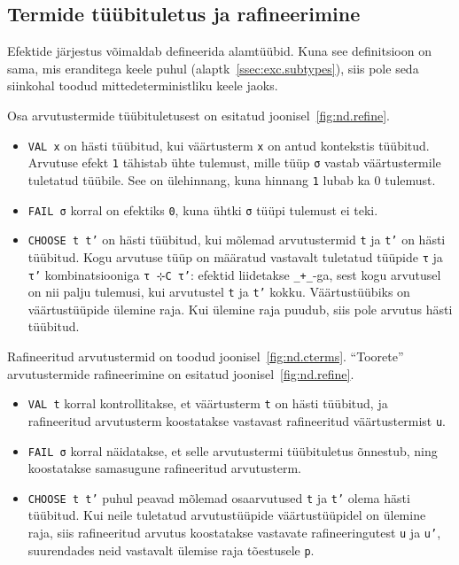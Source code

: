\documentclass[a4paper,12pt]{article}
\begin{document}
\subsection{Termide tüübituletus ja rafineerimine}

Efektide järjestus võimaldab defineerida alamtüübid.
Kuna see definitsioon on sama, mis eranditega keele puhul (alaptk~\ref{ssec:exc.subtypes}), siis pole seda siinkohal toodud mittedeterministliku keele jaoks.

Osa arvutustermide tüübituletusest on esitatud joonisel~\ref{fig:nd.refine}.
\begin{itemize}
\item {\tt VAL x} on hästi tüübitud, kui väärtusterm {\tt x} on antud kontekstis tüübitud. Arvutuse efekt {\tt 1} tähistab ühte tulemust, mille tüüp {\tt σ} vastab väärtustermile tuletatud tüübile. See on ülehinnang, kuna hinnang {\tt 1} lubab ka 0 tulemust.
\item {\tt FAIL σ} korral on efektiks {\tt 0}, kuna ühtki {\tt σ} tüüpi tulemust ei teki.
\item {\tt CHOOSE t t'} on hästi tüübitud, kui mõlemad arvutustermid {\tt t} ja {\tt t'} on hästi tüübitud. Kogu arvutuse tüüp on määratud vastavalt tuletatud tüüpide {\tt τ} ja {\tt τ'} kombinatsiooniga {\tt τ ⊹C τ'}: efektid liidetakse {\tt _+_}-ga, sest kogu arvutusel on nii palju tulemusi, kui arvutustel {\tt t} ja {\tt t'} kokku. Väärtustüübiks on väärtustüüpide ülemine raja. Kui ülemine raja puudub, siis pole arvutus hästi tüübitud.
\end{itemize}

Rafineeritud arvutustermid on toodud joonisel~\ref{fig:nd.cterms}.
``Toorete'' arvutustermide rafineerimine on esitatud joonisel~\ref{fig:nd.refine}.
\begin{itemize}
\item {\tt VAL t} korral kontrollitakse, et väärtusterm {\tt t} on hästi tüübitud, ja rafineeritud arvutusterm koostatakse vastavast rafineeritud väärtustermist {\tt u}.
\item {\tt FAIL σ} korral näidatakse, et selle arvutustermi tüübituletus õnnestub, ning koostatakse samasugune rafineeritud arvutusterm.
\item {\tt CHOOSE t t'} puhul peavad mõlemad osaarvutused {\tt t} ja {\tt t'} olema hästi tüübitud. Kui neile tuletatud arvutustüüpide väärtustüüpidel on ülemine raja, siis rafineeritud arvutus koostatakse vastavate rafineeringutest {\tt u} ja {\tt u'}, suurendades neid vastavalt ülemise raja tõestusele {\tt p}.
\end{itemize}
\end{document}
